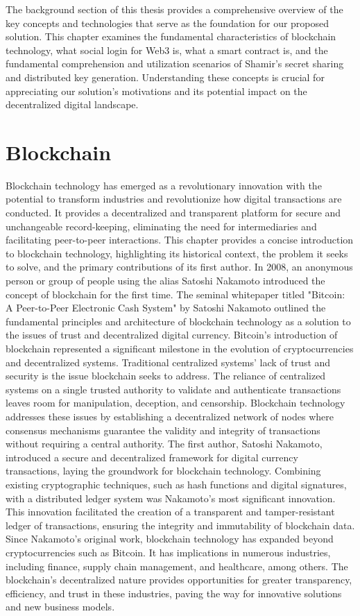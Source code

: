 \documentclass[../Main.tex]{subfiles}
\begin{document}
The background section of this thesis provides a comprehensive overview of the key concepts and technologies that serve as the foundation for our proposed solution. This chapter examines the fundamental characteristics of blockchain technology, what social login for Web3 is, what a smart contract is, and the fundamental comprehension and utilization scenarios of Shamir's secret sharing and distributed key generation. Understanding these concepts is crucial for appreciating our solution's motivations and its potential impact on the decentralized digital landscape.
\section{Blockchain}
\label{section:2.1}
Blockchain technology has emerged as a revolutionary innovation with the potential to transform industries and revolutionize how digital transactions are conducted. It provides a decentralized and transparent platform for secure and unchangeable record-keeping, eliminating the need for intermediaries and facilitating peer-to-peer interactions. This chapter provides a concise introduction to blockchain technology, highlighting its historical context, the problem it seeks to solve, and the primary contributions of its first author. In 2008, an anonymous person or group of people using the alias Satoshi Nakamoto \cite{Bitcoin} introduced the concept of blockchain for the first time. The seminal whitepaper titled "Bitcoin: A Peer-to-Peer Electronic Cash System" by Satoshi Nakamoto outlined the fundamental principles and architecture of blockchain technology as a solution to the issues of trust and decentralized digital currency. Bitcoin's introduction of blockchain represented a significant milestone in the evolution of cryptocurrencies and decentralized systems. Traditional centralized systems' lack of trust and security is the issue blockchain seeks to address. The reliance of centralized systems on a single trusted authority to validate and authenticate transactions leaves room for manipulation, deception, and censorship. Blockchain technology addresses these issues by establishing a decentralized network of nodes where consensus mechanisms guarantee the validity and integrity of transactions without requiring a central authority. The first author, Satoshi Nakamoto, introduced a secure and decentralized framework for digital currency transactions, laying the groundwork for blockchain technology. Combining existing cryptographic techniques, such as hash functions and digital signatures, with a distributed ledger system was Nakamoto's most significant innovation. This innovation facilitated the creation of a transparent and tamper-resistant ledger of transactions, ensuring the integrity and immutability of blockchain data. Since Nakamoto's original work, blockchain technology has expanded beyond cryptocurrencies such as Bitcoin. It has implications in numerous industries, including finance, supply chain management, and healthcare, among others. The blockchain's decentralized nature provides opportunities for greater transparency, efficiency, and trust in these industries, paving the way for innovative solutions and new business models.
\end{document}
